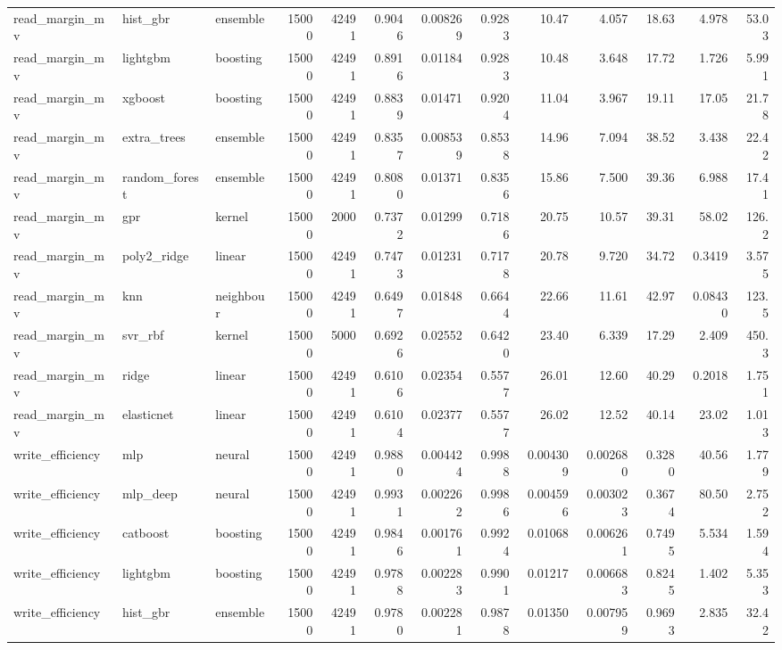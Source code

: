 \begin{table}[!t]
\begin{tabular}{lllrrrrrrrrrr}
read\_margin\_mv & hist\_gbr & ensemble & 15000 & 42491 & 0.9046 & 0.008269 & 0.9283 & 10.47 & 4.057 & 18.63 & 4.978 & 53.03 \\
read\_margin\_mv & lightgbm & boosting & 15000 & 42491 & 0.8916 & 0.01184 & 0.9283 & 10.48 & 3.648 & 17.72 & 1.726 & 5.991 \\
read\_margin\_mv & xgboost & boosting & 15000 & 42491 & 0.8839 & 0.01471 & 0.9204 & 11.04 & 3.967 & 19.11 & 17.05 & 21.78 \\
read\_margin\_mv & extra\_trees & ensemble & 15000 & 42491 & 0.8357 & 0.008539 & 0.8538 & 14.96 & 7.094 & 38.52 & 3.438 & 22.42 \\
read\_margin\_mv & random\_forest & ensemble & 15000 & 42491 & 0.8080 & 0.01371 & 0.8356 & 15.86 & 7.500 & 39.36 & 6.988 & 17.41 \\
read\_margin\_mv & gpr & kernel & 15000 & 2000 & 0.7372 & 0.01299 & 0.7186 & 20.75 & 10.57 & 39.31 & 58.02 & 126.2 \\
read\_margin\_mv & poly2\_ridge & linear & 15000 & 42491 & 0.7473 & 0.01231 & 0.7178 & 20.78 & 9.720 & 34.72 & 0.3419 & 3.575 \\
read\_margin\_mv & knn & neighbour & 15000 & 42491 & 0.6497 & 0.01848 & 0.6644 & 22.66 & 11.61 & 42.97 & 0.08430 & 123.5 \\
read\_margin\_mv & svr\_rbf & kernel & 15000 & 5000 & 0.6926 & 0.02552 & 0.6420 & 23.40 & 6.339 & 17.29 & 2.409 & 450.3 \\
read\_margin\_mv & ridge & linear & 15000 & 42491 & 0.6106 & 0.02354 & 0.5577 & 26.01 & 12.60 & 40.29 & 0.2018 & 1.751 \\
read\_margin\_mv & elasticnet & linear & 15000 & 42491 & 0.6104 & 0.02377 & 0.5577 & 26.02 & 12.52 & 40.14 & 23.02 & 1.013 \\
write\_efficiency & mlp & neural & 15000 & 42491 & 0.9880 & 0.004424 & 0.9988 & 0.004309 & 0.002680 & 0.3280 & 40.56 & 1.779 \\
write\_efficiency & mlp\_deep & neural & 15000 & 42491 & 0.9931 & 0.002262 & 0.9986 & 0.004596 & 0.003023 & 0.3674 & 80.50 & 2.752 \\
write\_efficiency & catboost & boosting & 15000 & 42491 & 0.9846 & 0.001761 & 0.9924 & 0.01068 & 0.006261 & 0.7495 & 5.534 & 1.594 \\
write\_efficiency & lightgbm & boosting & 15000 & 42491 & 0.9788 & 0.002283 & 0.9901 & 0.01217 & 0.006683 & 0.8245 & 1.402 & 5.353 \\
write\_efficiency & hist\_gbr & ensemble & 15000 & 42491 & 0.9780 & 0.002281 & 0.9878 & 0.01350 & 0.007959 & 0.9693 & 2.835 & 32.42 \\

\end{tabular}
\end{table}
